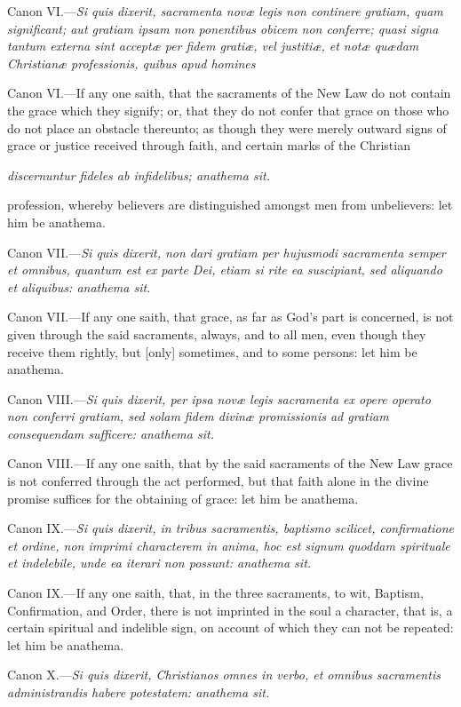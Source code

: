 Canon VI.—\emph{Si quis dixerit, sacramenta novæ legis non continere gratiam, quam significant; aut gratiam ipsam non ponentibus obicem non conferre; quasi signa tantum externa sint acceptæ per fidem gratiæ, vel justitiæ, et notæ quædam Christianæ professionis, quibus apud homines }

Canon VI.—If any one saith, that the sacraments of the New Law do not contain the grace which they signify; or, that they do not confer that grace on those who do not place an obstacle thereunto; as though they were merely outward signs of grace or justice received through faith, and certain marks of the Christian

\emph{discernuntur fideles ab infidelibus; anathema sit.}

profession, whereby believers are distinguished amongst men from unbelievers: let him be anathema.

Canon VII.—\emph{Si quis dixerit, non dari gratiam per hujusmodi sacramenta semper et omnibus, quantum est ex parte Dei, etiam si rite ea suscipiant, sed aliquando et aliquibus: anathema sit.}

Canon VII.—If any one saith, that grace, as far as God's part is concerned, is not given through the said sacraments, always, and to all men, even though they receive them rightly, but [only] sometimes, and to some persons: let him be anathema.

Canon VIII.—\emph{Si quis dixerit, per ipsa novæ legis sacramenta ex opere operato non conferri gratiam, sed solam fidem divinæ promissionis ad gratiam consequendam sufficere: anathema sit.}

Canon VIII.—If any one saith, that by the said sacraments of the New Law grace is not conferred through the act performed, but that faith alone in the divine promise suffices for the obtaining of grace: let him be anathema.

Canon IX.—\emph{Si quis dixerit, in tribus sacramentis, baptismo scilicet, confirmatione et ordine, non imprimi characterem in anima, hoc est signum quoddam spirituale et indelebile, unde ea iterari non possunt: anathema sit.}

Canon IX.—If any one saith, that, in the three sacraments, to wit, Baptism, Confirmation, and Order, there is not imprinted in the soul a character, that is, a certain spiritual and indelible sign, on account of which they can not be repeated: let him be anathema.

Canon X.—\emph{Si quis dixerit, Christianos omnes in verbo, et omnibus sacramentis administrandis habere potestatem: anathema sit.}

